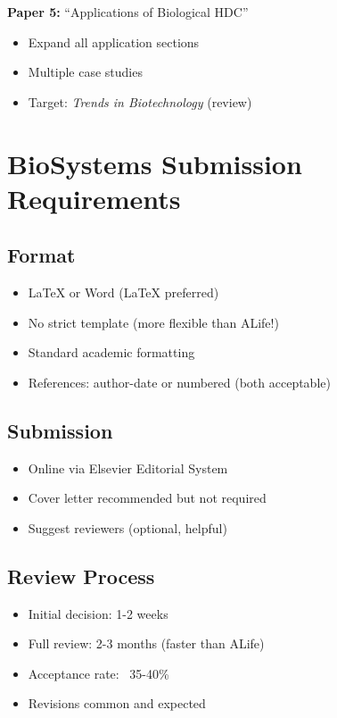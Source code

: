 \documentclass[11pt]{article}
\begin{document}
\textbf{Paper 5:} ``Applications of Biological HDC''
\begin{itemize}
    \item Expand all application sections
    \item Multiple case studies
    \item Target: \textit{Trends in Biotechnology} (review)
\end{itemize}

\section{BioSystems Submission Requirements}

\subsection{Format}
\begin{itemize}
    \item LaTeX or Word (LaTeX preferred)
    \item No strict template (more flexible than ALife!)
    \item Standard academic formatting
    \item References: author-date or numbered (both acceptable)
\end{itemize}

\subsection{Submission}
\begin{itemize}
    \item Online via Elsevier Editorial System
    \item Cover letter recommended but not required
    \item Suggest reviewers (optional, helpful)
\end{itemize}

\subsection{Review Process}
\begin{itemize}
    \item Initial decision: 1-2 weeks
    \item Full review: 2-3 months (faster than ALife)
    \item Acceptance rate: ~35-40\%
    \item Revisions common and expected
\end{itemize}
\end{document}
